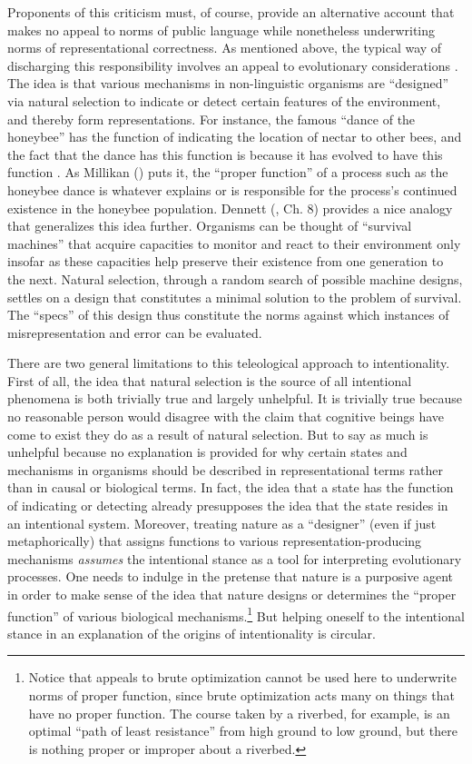 Proponents of this criticism must, of course, provide an alternative account that makes no appeal to norms of public language while nonetheless underwriting norms of representational correctness. As mentioned above, the typical way of discharging this responsibility involves an appeal to evolutionary considerations \citep{Millikan:1989,Millikan:2005,Dennett:1987,Dennett:2010}. The idea is that various mechanisms in non-linguistic organisms are ``designed'' via natural selection to indicate or detect certain features of the environment, and thereby form representations. For instance, the famous ``dance of the honeybee'' has the function of indicating the location of nectar to other bees, and the fact that the dance has this function is because it has evolved to have this function \citep[see][]{Sellars:1954}. As Millikan (\citeyear{Millikan:1989}) puts it, the ``proper function'' of a process such as the honeybee dance is whatever explains or is responsible for the process's continued existence in the honeybee population. Dennett (\citeyear{Dennett:1987}, Ch. 8) provides a nice analogy that generalizes this idea further. Organisms can be thought of ``survival machines'' that acquire capacities to monitor and react to their environment only insofar as these capacities help preserve their existence from one generation to the next. Natural selection, through a random search of possible machine designs, settles on a design that constitutes a minimal solution to the problem of survival. The ``specs'' of this design thus constitute the norms against which instances of misrepresentation and error can be evaluated. 

There are two general limitations to this teleological approach to intentionality. First of all, the idea that natural selection is the source of all intentional phenomena is both trivially true and largely unhelpful. It is trivially true because no reasonable person would disagree with the claim that cognitive beings have come to exist they do as a result of natural selection. But to say as much is unhelpful because no explanation is provided for why certain states and mechanisms in organisms should be described in representational terms rather than in causal or biological terms. In fact, the idea that a state has the function of indicating or detecting already presupposes the idea that the state resides in an intentional system. Moreover, treating nature as a ``designer'' (even if just metaphorically) that assigns functions to various representation-producing mechanisms \textit{assumes} the intentional stance as a tool for interpreting evolutionary processes. One needs to indulge in the pretense that nature is a purposive agent in order to make sense of the idea that nature designs or determines the ``proper function'' of various biological mechanisms.\footnote{Notice that appeals to brute optimization cannot be used here to underwrite norms of proper function, since brute optimization acts many on things that have no proper function. The course taken by a riverbed, for example, is an optimal ``path of least resistance'' from high ground to low ground, but there is nothing proper or improper about a riverbed.} But helping oneself to the intentional stance in an explanation of the origins of intentionality is circular. 

